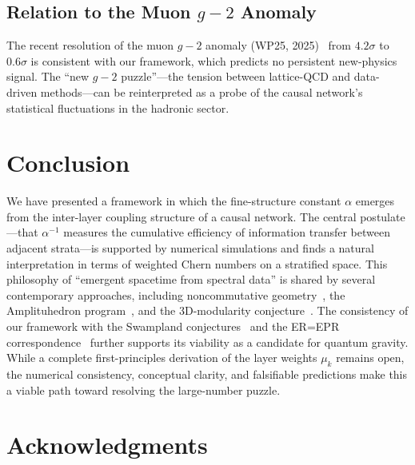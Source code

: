 \documentclass[11pt,a4paper]{article}
\theoremstyle{definition}
\theoremstyle{remark}
\begin{document}
\subsection[Relation to the Muon g-2 Anomaly]{Relation to the Muon $g-2$ Anomaly}\label{subsec:g2}

The recent resolution of the muon $g-2$ anomaly (WP25,
2025)~\cite{MuonG2Theory2025,MuonG2Exp2025} from $4.2\sigma$ to $0.6\sigma$ is
consistent with our framework, which predicts no persistent new-physics signal.
The ``new $g-2$ puzzle''---the tension between lattice-QCD and data-driven
methods---can be reinterpreted as a probe of the causal network's statistical
fluctuations in the hadronic sector.

\section{Conclusion}\label{sec:conclusion}

We have presented a framework in which the fine-structure constant $\alpha$
emerges from the inter-layer coupling structure of a causal network.  The
central postulate---that $\alpha^{-1}$ measures the cumulative efficiency of
information transfer between adjacent strata---is supported by numerical
simulations and finds a natural interpretation in terms of weighted Chern
numbers on a stratified space.  This philosophy of ``emergent spacetime from
spectral data'' is shared by several contemporary approaches, including
noncommutative geometry~\cite{Connes1994,ChamseddineConnes1996}, the
Amplituhedron program~\cite{ArkaniHamed2014,ArkaniHamed2023}, and the
3D-modularity conjecture~\cite{Cheng2019,Gukov2017}.  The consistency of our
framework with the Swampland conjectures~\cite{Palti2019} and the
ER=EPR correspondence~\cite{MaldacenaSusskind2013} further supports its
viability as a candidate for quantum gravity.  While a complete
first-principles derivation of the layer weights $\mu_{k}$ remains open, the
numerical consistency, conceptual clarity, and falsifiable predictions make
this a viable path toward resolving the large-number puzzle.

\section*{Acknowledgments}
\end{document}
